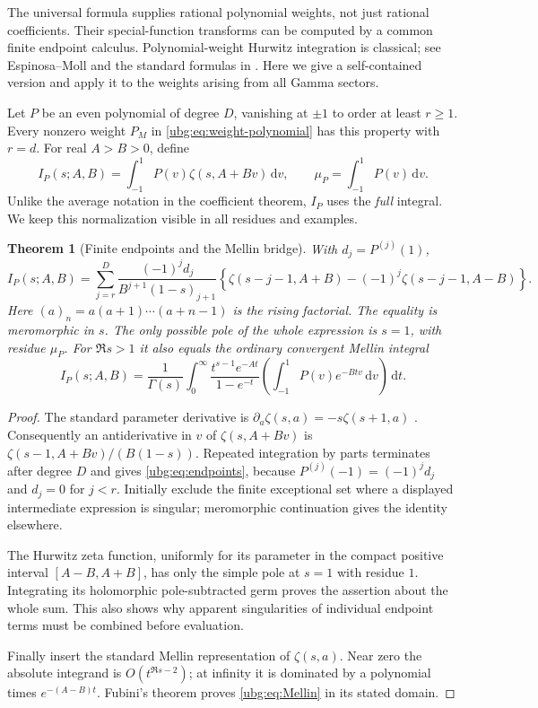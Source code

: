 \documentclass[11pt,letterpaper]{article}
\numberwithin{equation}{section}
\newtheorem{theorem}{Theorem}[section]
\theoremstyle{definition}\newtheorem{definition}[theorem]{Definition}
\theoremstyle{remark}\newtheorem{remark}[theorem]{Remark}
\newcommand{\dd}{\,\mathrm d}\newcommand{\ii}{\mathrm i}
\begin{document}
The universal formula supplies rational polynomial weights, not just
rational coefficients. Their special-function transforms can be
computed by a common finite endpoint calculus. Polynomial-weight
Hurwitz integration is classical; see Espinosa--Moll
\cite{EM1,EM2} and the standard formulas in \cite{DLMFzeta}.
Here we give a self-contained version and apply it to the weights
arising from all Gamma sectors.

Let $P$ be an even polynomial of degree $D$, vanishing at $\pm1$ to
order at least $r\ge1$. Every nonzero weight $P_M$ in
\eqref{ubg:eq:weight-polynomial} has this property with $r=d$.
For real $A>B>0$, define
\begin{equation}\label{ubg:eq:IP}
 I_P(s;A,B)=\int_{-1}^1P(v)\zeta(s,A+Bv)\dd v,
 \qquad \mu_P=\int_{-1}^1P(v)\dd v.
\end{equation}
Unlike the average notation in the coefficient theorem, $I_P$ uses
the \emph{full} integral. We keep this normalization visible in all
residues and examples.

\begin{theorem}[Finite endpoints and the Mellin bridge]
\label{ubg:thm:endpoints}
With $d_j=P^{(j)}(1)$,
\begin{equation}\label{ubg:eq:endpoints}
 \boxed{\displaystyle
 I_P(s;A,B)=\sum_{j=r}^D
 \frac{(-1)^j d_j}
      {B^{j+1}(1-s)_{j+1}}
 \left\{\zeta(s-j-1,A+B)-(-1)^j\zeta(s-j-1,A-B)\right\}.}
\end{equation}
Here $(a)_n=a(a+1)\cdots(a+n-1)$ is the rising factorial.
The equality is meromorphic in $s$. The only possible pole of the
whole expression is $s=1$, with residue $\mu_P$.
For $\Re s>1$ it also equals the ordinary convergent Mellin integral
\begin{equation}\label{ubg:eq:Mellin}
 I_P(s;A,B)=\frac1{\Gamma(s)}\int_0^\infty
    \frac{t^{s-1}e^{-At}}{1-e^{-t}}
       \left(\int_{-1}^1P(v)e^{-Btv}\dd v\right)\dd t.
\end{equation}
\end{theorem}
\begin{proof}
The standard parameter derivative is
$\partial_a\zeta(s,a)=-s\zeta(s+1,a)$ \cite{DLMFzeta}.
Consequently an antiderivative in $v$ of $\zeta(s,A+Bv)$ is
$\zeta(s-1,A+Bv)/(B(1-s))$.
Repeated integration by parts terminates after degree $D$ and gives
\eqref{ubg:eq:endpoints}, because $P^{(j)}(-1)=(-1)^jd_j$ and
$d_j=0$ for $j<r$.
Initially exclude the finite exceptional set where a displayed
intermediate expression is singular; meromorphic continuation gives
the identity elsewhere.

The Hurwitz zeta function, uniformly for its parameter in the compact
positive interval $[A-B,A+B]$, has only the simple pole at $s=1$ with
residue $1$. Integrating its holomorphic pole-subtracted germ proves
the assertion about the whole sum. This also shows why apparent
singularities of individual endpoint terms must be combined before
evaluation.

Finally insert the standard Mellin representation of $\zeta(s,a)$.
Near zero the absolute integrand is $O(t^{\Re s-2})$; at infinity it
is dominated by a polynomial times $e^{-(A-B)t}$. Fubini's theorem
proves \eqref{ubg:eq:Mellin} in its stated domain.
\end{proof}
\end{document}
